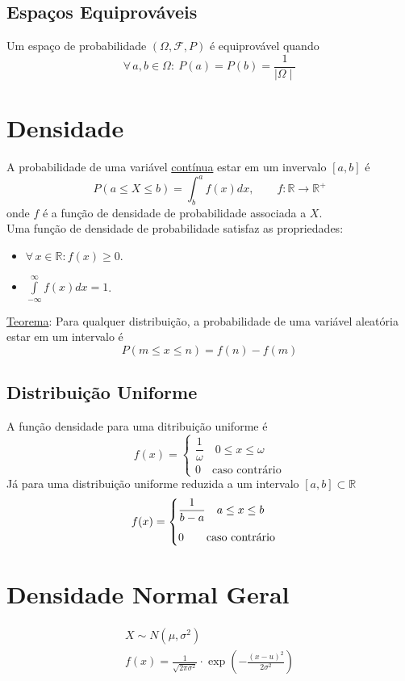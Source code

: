 \documentclass{article}
\begin{document}
\subsection{Espaços Equiprováveis}
Um espaço de probabilidade $(\Omega, \mathcal{F}, P)$ é equiprovável quando
\[ \forall \, a, b \in \Omega: \> P({a}) = P({b}) = \frac{1}{\mid \Omega \mid} \]



\section{Densidade}
A probabilidade de uma variável \uline{contínua} estar em um invervalo $[a,b]$ é
\[ P(a \leq X \leq b) = \int_b^a f(x) dx, \qquad f: \mathbb{R} \to \mathbb{R}^+ \]
onde $f$ é a função de densidade de probabilidade associada a $X$. \\[10pt]
Uma função de densidade de probabilidade satisfaz as propriedades:
\begin{itemize}
  \item $\forall\, x \in \mathbb{R}: f(x) \geq 0$.
  \item $\int\limits_{-\infty}^{\infty} f(x) dx = 1$.
\end{itemize}
\uline{Teorema}: Para qualquer distribuição, a probabilidade de uma variável aleatória estar em um intervalo é
\[ P(m \leq x \leq n) = f(n) - f(m) \]

\subsection{Distribuição Uniforme}
A função densidade para uma ditribuição uniforme é
\[
  f(x) = \begin{cases}
          \dfrac{1}{\omega} \quad 0 \leq x \leq \omega \\[10pt]
          0 \quad \text{caso contrário}
         \end{cases}
\]
Já para uma distribuição uniforme reduzida a um intervalo $[a,b] \subset \mathbb{R}$
\[
  f(x) = \begin{cases}
          \dfrac{1}{b - a} \quad a \leq x \leq b \\[10pt]
          0 \qquad \text{caso contrário}
         \end{cases} \\[10pt]
\]


\section{Densidade Normal Geral}
\begin{gather*}
  X \sim N(\mu, \sigma^2) \\[5pt]
  f(x) = \frac{1}{\sqrt{2 \pi \sigma^2}} \cdot \exp \left(- \frac{{(x - u)}^2}{2\sigma^2} \right)
\end{gather*}
\end{document}
